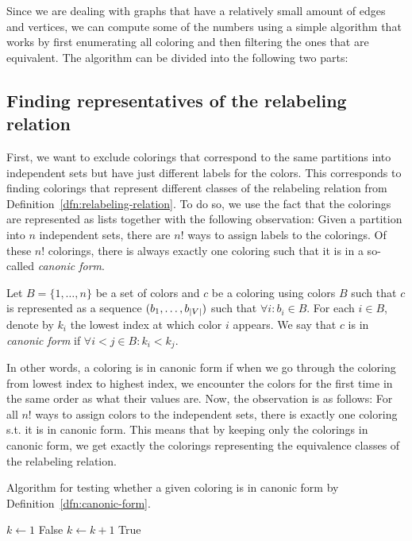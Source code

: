 Since we are dealing with graphs that have a relatively small amount of edges and vertices, we can compute some of the numbers using a simple algorithm that works by first enumerating all coloring and then filtering the ones that are equivalent. The algorithm can be divided into the following two parts:

\subsection{Finding representatives of the relabeling relation}

First, we want to exclude colorings that correspond to the same partitions into independent sets but have just different labels for the colors. This corresponds to finding colorings that represent different classes of the relabeling relation from Definition~\ref{dfn:relabeling-relation}. To do so, we use the fact that the colorings are represented as lists together with the following observation: Given a partition into $n$ independent sets, there are $n!$ ways to assign labels to the colorings. Of these $n!$ colorings, there is always exactly one coloring such that it is in a so-called \textit{canonic form}.  

\begin{defn}\label{dfn:canonic-form}
    Let $B=\{1,\ldots,n\}$ be a set of colors and $c$ be a coloring using colors $B$ such that $c$ is represented as a sequence $(b_1, \ldots,b_{\left|{V}\right|})$ such that $\forall i: b_i \in B$. For each $i \in B$, denote by $k_i$ the lowest index at which color $i$ appears. We say that $c$ is in \emph{canonic form} if $\forall i < j \in B: k_i < k_j$.
\end{defn}

In other words, a coloring is in canonic form if when we go through the coloring from lowest index to highest index, we encounter the colors for the first time in the same order as what their values are. Now, the observation is as follows: For all $n!$ ways to assign colors to the independent sets, there is exactly one coloring s.t. it is in canonic form. This means that by keeping only the colorings in canonic form, we get exactly the colorings representing the equivalence classes of the relabeling relation.

\begin{algorithm}[H]
    \caption{Algorithm for testing whether a given coloring is in canonic form by Definition~\ref{dfn:canonic-form}.} 
    \begin{algorithmic}[1]
            \State $k \gets 1$      
                    \State \Return False
                \EndIf
                    \State $k \gets k + 1$
                \EndIf
            \EndFor   
            \State \Return True
        \EndFunction
    \end{algorithmic}
    \label{alg:is-in-canonic-form}
\end{algorithm}

